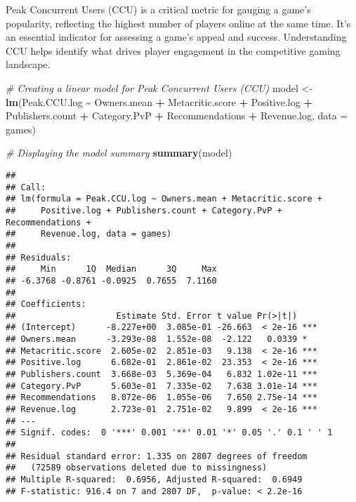 \documentclass[
]{article}
\newenvironment{Shaded}{\begin{snugshade}}{\end{snugshade}}
\newcommand{\AttributeTok}[1]{\textcolor[rgb]{0.13,0.29,0.53}{#1}}
\newcommand{\CommentTok}[1]{\textcolor[rgb]{0.56,0.35,0.01}{\textit{#1}}}
\newcommand{\FunctionTok}[1]{\textcolor[rgb]{0.13,0.29,0.53}{\textbf{#1}}}
\newcommand{\NormalTok}[1]{#1}
\newcommand{\OtherTok}[1]{\textcolor[rgb]{0.56,0.35,0.01}{#1}}
\newcommand{\SpecialCharTok}[1]{\textcolor[rgb]{0.81,0.36,0.00}{\textbf{#1}}}
\begin{document}
Peak Concurrent Users (CCU) is a critical metric for gauging a game's
popularity, reflecting the highest number of players online at the same
time. It's an essential indicator for assessing a game's appeal and
success. Understanding CCU helps identify what drives player engagement
in the competitive gaming landscape.

\begin{Shaded}
\begin{Highlighting}[]
\CommentTok{\# Creating a linear model for Peak Concurrent Users (CCU)}
\NormalTok{model }\OtherTok{\textless{}{-}} \FunctionTok{lm}\NormalTok{(Peak.CCU.log }\SpecialCharTok{\textasciitilde{}}\NormalTok{ Owners.mean }\SpecialCharTok{+}\NormalTok{ Metacritic.score }\SpecialCharTok{+} 
\NormalTok{              Positive.log }\SpecialCharTok{+}\NormalTok{ Publishers.count }\SpecialCharTok{+}\NormalTok{ Category.PvP }\SpecialCharTok{+} 
\NormalTok{              Recommendations }\SpecialCharTok{+}\NormalTok{ Revenue.log, }\AttributeTok{data =}\NormalTok{ games)}

\CommentTok{\# Displaying the model summary}
\FunctionTok{summary}\NormalTok{(model)}
\end{Highlighting}
\end{Shaded}

\begin{verbatim}
## 
## Call:
## lm(formula = Peak.CCU.log ~ Owners.mean + Metacritic.score + 
##     Positive.log + Publishers.count + Category.PvP + Recommendations + 
##     Revenue.log, data = games)
## 
## Residuals:
##     Min      1Q  Median      3Q     Max 
## -6.3768 -0.8761 -0.0925  0.7655  7.1160 
## 
## Coefficients:
##                    Estimate Std. Error t value Pr(>|t|)    
## (Intercept)      -8.227e+00  3.085e-01 -26.663  < 2e-16 ***
## Owners.mean      -3.293e-08  1.552e-08  -2.122   0.0339 *  
## Metacritic.score  2.605e-02  2.851e-03   9.138  < 2e-16 ***
## Positive.log      6.682e-01  2.861e-02  23.353  < 2e-16 ***
## Publishers.count  3.668e-03  5.369e-04   6.832 1.02e-11 ***
## Category.PvP      5.603e-01  7.335e-02   7.638 3.01e-14 ***
## Recommendations   8.072e-06  1.055e-06   7.650 2.75e-14 ***
## Revenue.log       2.723e-01  2.751e-02   9.899  < 2e-16 ***
## ---
## Signif. codes:  0 '***' 0.001 '**' 0.01 '*' 0.05 '.' 0.1 ' ' 1
## 
## Residual standard error: 1.335 on 2807 degrees of freedom
##   (72589 observations deleted due to missingness)
## Multiple R-squared:  0.6956, Adjusted R-squared:  0.6949 
## F-statistic: 916.4 on 7 and 2807 DF,  p-value: < 2.2e-16
\end{verbatim}
\end{document}
